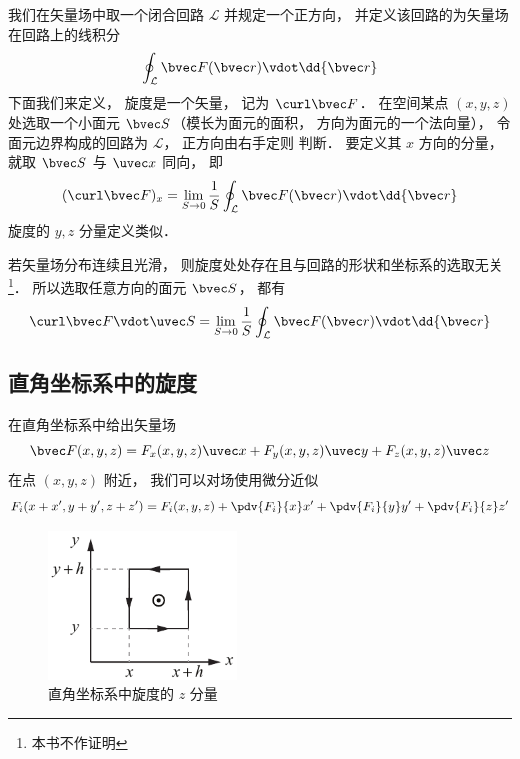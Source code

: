 
我们在矢量场中取一个闭合回路 $\mathcal L$ 并规定一个正方向， 并定义该回路的为矢量场在回路上的线积分
\begin{equation}
\oint_{\mathcal L} \bvec F(\bvec r) \vdot \dd{\bvec r}
\end{equation}
下面我们来定义， 旋度是一个矢量， 记为 $\curl \bvec F$． 在空间某点 $(x,y,z)$ 处选取一个小面元 $\bvec S$（模长为面元的面积， 方向为面元的一个法向量）， 令面元边界构成的回路为 $\mathcal L$， 正方向由右手定则 判断． 要定义其 $x$ 方向的分量， 就取 $\bvec S$ 与 $\uvec x$ 同向， 即
\begin{equation}
(\curl\bvec F)_x = \lim_{S\to 0} \frac 1S \oint_{\mathcal L} \bvec F(\bvec r) \vdot \dd{\bvec r}
\end{equation}
旋度的 $y, z$ 分量定义类似．

若矢量场分布连续且光滑， 则旋度处处存在且与回路的形状和坐标系的选取无关\footnote{本书不作证明}． 所以选取任意方向的面元 $\bvec S$， 都有
\begin{equation}\label{Curl_eq3}
\curl\bvec F \vdot \uvec S = \lim_{S\to 0} \frac 1S \oint_{\mathcal L} \bvec F(\bvec r) \vdot \dd{\bvec r}
\end{equation}

\subsection{直角坐标系中的旋度}
在直角坐标系中给出矢量场
\begin{equation}
\bvec F(x,y,z) = F_x(x,y,z)\uvec x + F_y(x,y,z)\uvec y + F_z(x,y,z)\uvec z
\end{equation}
在点 $(x,y,z)$ 附近， 我们可以对场使用微分近似
\begin{equation}
F_i(x+x', y+y', z+z') = F_i(x,y,z) + \pdv{F_i}{x}x' + \pdv{F_i}{y}y' + \pdv{F_i}{z}z'
\end{equation}

\begin{figure}[ht]
\centering
\includegraphics[width=5cm]{./figures/Curl1.pdf}
\caption{直角坐标系中旋度的 $z$ 分量} \label{Curl_fig1}
\end{figure}

